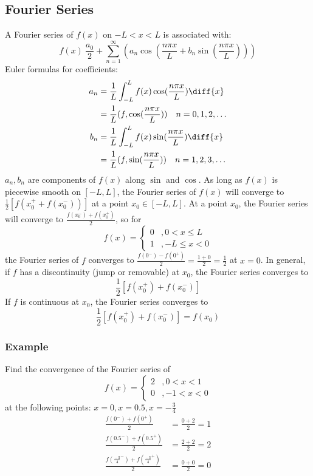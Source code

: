 \documentclass{math}
\begin{document}
\subsection*{Fourier Series}
A Fourier series of \( f(x) \) on \( -L<x<L \) is associated with:
\[ f(x) ~ \frac{a_0}{2}+\sum_{n=1}^{\infty}(a_n\cos(\frac{n\pi x}{L}+
b_n\sin(\frac{n\pi x}{L}))) \]
Euler formulas for coefficients:
\begin{align*}
  a_n &= \frac{1}{L}\int_{-L}^{L}f(x)\cos(\frac{n\pi x}{L})\diff{x} \\
  &= \frac{1}{L}(f,\cos(\frac{n\pi x}{L})) \quad n = 0,1,2,\dots \\
  b_n &= \frac{1}{L}\int_{-L}^{L}f(x)\sin(\frac{n\pi x}{L})\diff{x} \\
  &= \frac{1}{L}(f,\sin(\frac{n\pi x}{L})) \quad n = 1,2,3,\dots
\end{align*}
\( a_n,b_n \) are components of \( f(x) \) along \( \sin \) and \( \cos \).
As long as \( f(x) \) is piecewise smooth on \( [-L,L] \), the Fourier series
of \( f(x) \) will converge to \( \frac{1}{2}[f(x_0^++f(x_0^-))] \) at a point
\( x_0\in[-L,L] \). At a point \( x_0 \), the Fourier series will converge to
\( \frac{f(x_0^-)+f(x_0^+)}{2} \), so for
\[ f(x) = \begin{cases}
  0 &, 0<x\le L \\
  1 &, -L\le x<0
\end{cases} \]
the Fourier series of \( f \) converges to \( \frac{f(0^-)-f(0^+)}{2} =
\frac{1+0}{2} = \frac{1}{2} \) at \( x = 0 \). In general, if \( f \) has a
discontinuity (jump or removable) at \( x_0 \), the Fourier series converges to
\[ \frac{1}{2}[f(x_0^+)+f(x_0^-)] \]
If \( f \) is continuous at \( x_0 \), the Fourier series converges to
\[ \frac{1}{2}[f(x_0^+)+f(x_0^-)] = f(x_0) \]

\subsubsection*{Example}
Find the convergence of the Fourier series of
\[ f(x) = \begin{cases}
  2 &, 0<x<1 \\
  0 &, -1<x<0
\end{cases} \]
at the following points: \( x = 0, x = 0.5, x = -\frac{3}{4} \)
\begin{align*}
  \frac{f(0^-)+f(0^+)}{2} &= \frac{0+2}{2} = 1 \\
  \frac{f(0.5^-)+f(0.5^+)}{2} &= \frac{2+2}{2} = 2 \\
  \frac{f(\frac{-3}{4}^-)+f(\frac{-3}{4}^+)}{2} &= \frac{0+0}{2} = 0
\end{align*}
\end{document}
